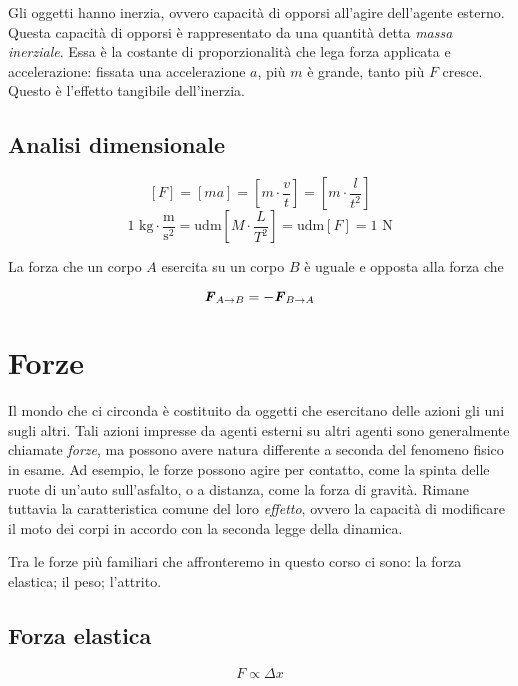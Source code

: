 \noindent Gli oggetti hanno inerzia, ovvero capacità di opporsi all'agire dell'agente
esterno. Questa capacità di opporsi è rappresentato da una quantità detta
\textit{massa inerziale}. Essa è la costante di proporzionalità che lega forza applicata
e accelerazione: fissata una accelerazione $a$, più $m$ è grande, tanto più $F$ cresce.
Questo è l'effetto tangibile dell'inerzia.

\subsection*{Analisi dimensionale}
\[ [F] = [ma] = \left[m\cdot\frac{v}{t}\right] = \left[m\cdot\frac{l}{t^2}\right]  \]
\[ 1\text{ kg}\cdot\frac{\text{m}}{\text{s}^2} = \text{udm}\left[M\cdot\frac{L}{T^2}\right] = \text{udm}[F] = 1\text{ N} \]



\begin{tcolorbox}[colback = red!30, colframe = red!30!black, title = {Terza legge della dinamica (legge di azione e reazione)}]
La forza che un corpo $A$ esercita su un corpo $B$ è uguale e opposta alla forza
che

\[ \textbf{\textit{F}}_{A\to B} = -\textbf{\textit{F}}_{B\to A} \]
\end{tcolorbox}




\section{Forze}
Il mondo che ci circonda è costituito da oggetti che esercitano delle azioni gli
uni sugli altri. Tali azioni impresse da agenti esterni su altri agenti sono
generalmente chiamate \textit{forze}, ma possono avere natura differente a seconda
del fenomeno fisico in esame. Ad esempio, le forze possono agire per contatto, come
la spinta delle ruote di un'auto sull'asfalto, o a distanza, come la forza di gravità.
Rimane tuttavia la caratteristica comune del loro \textit{effetto}, ovvero la capacità
di modificare il moto dei corpi in accordo con la seconda legge della dinamica.

Tra le forze più familiari che affronteremo in questo corso ci sono:
la forza elastica; il peso; l'attrito.

\subsection{Forza elastica}

\[ F \propto \Delta x \]

